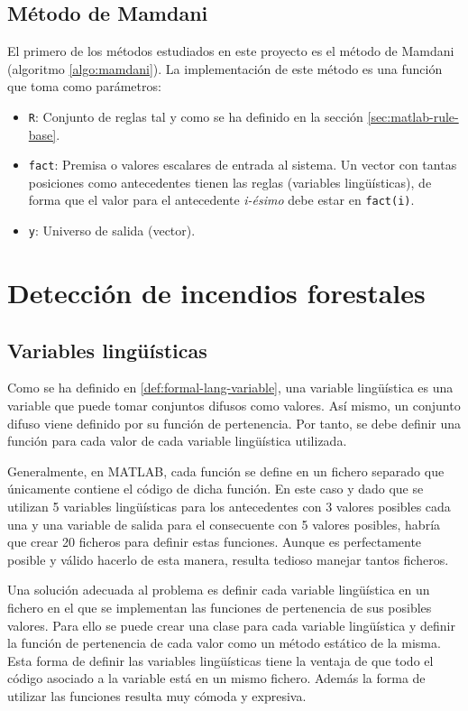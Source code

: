 \subsection{Método de Mamdani}
El primero de los métodos estudiados en este proyecto es el método de Mamdani (algoritmo \ref{algo:mamdani}). La implementación de este método es una función que toma como parámetros:
\begin{itemize}
\item \lstinline|R|: Conjunto de reglas tal y como se ha definido en la sección \ref{sec:matlab-rule-base}.
\item \lstinline|fact|: Premisa o valores escalares de entrada al sistema. Un vector con tantas posiciones como antecedentes tienen las reglas (variables lingüísticas), de forma que el valor para el antecedente \emph{i-ésimo} debe estar en \lstinline|fact(i)|.
\item \lstinline|y|: Universo de salida (vector).
\end{itemize}


 
\section{Detección de incendios forestales}
\subsection{Variables lingüísticas}
Como se ha definido en \ref{def:formal-lang-variable}, una variable lingüística es una variable que puede tomar conjuntos difusos como valores. Así mismo, un conjunto difuso viene definido por su función de pertenencia. Por tanto, se debe definir una función para cada valor de cada variable lingüística utilizada. 

Generalmente, en MATLAB, cada función se define en un fichero separado que únicamente contiene el código de dicha función. En este caso y dado que se utilizan 5 variables lingüísticas para los antecedentes con 3 valores posibles cada una y una variable de salida para el consecuente con 5 valores posibles, habría que crear 20 ficheros para definir estas funciones. Aunque es perfectamente posible y válido hacerlo de esta manera, resulta tedioso manejar tantos ficheros. 

Una solución adecuada al problema es definir cada variable lingüística en un fichero en el que se implementan las funciones de pertenencia de sus posibles valores. Para ello se puede crear una clase para cada variable lingüística y definir la función de pertenencia de cada valor como un método estático de la misma. Esta forma de definir las variables lingüísticas tiene la ventaja de que todo el código asociado a la variable está en un mismo fichero. Además la forma de utilizar las funciones resulta muy cómoda y expresiva.

